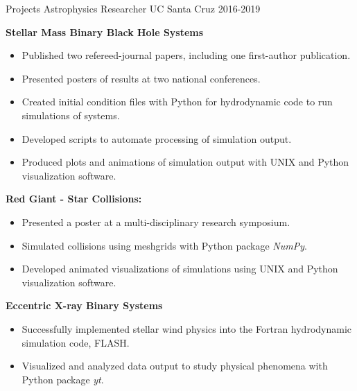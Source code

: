 
\begin{cventries}
	
  \cventry
	{Projects}
	{Astrophysics Researcher \vspace{1mm}}
	{UC Santa Cruz}
	{2016-2019}
	{
		\vspace{0.1cm}
		\begin{cvitems}
			\item {\textbf{Stellar Mass Binary Black Hole Systems}
				\begin{itemize}
					\item Published two refereed-journal papers, including one first-author publication.
					\item Presented posters of results at two national conferences.
					\item Created initial condition files with Python for hydrodynamic code to run simulations of systems. 
					\item Developed scripts to automate processing of simulation output.
					\item Produced plots and animations of simulation output with UNIX and Python visualization software.
				\end{itemize}}			
			\item {\textbf{Red Giant - Star Collisions:} 
				\begin{itemize}
				\item Presented a poster at a multi-disciplinary research symposium.
				\item Simulated collisions using meshgrids with Python package \emph{NumPy}.
				\item Developed animated visualizations of simulations using UNIX and Python visualization software.
				\end{itemize}}
			\item {\textbf{Eccentric X-ray Binary Systems}
				\begin{itemize}
					\item Successfully implemented stellar wind physics into the Fortran hydrodynamic simulation code, FLASH. 
					\item Visualized and analyzed data output to study physical phenomena with Python package \emph{yt}.
				\end{itemize}} 
		\end{cvitems}
	}
	  
  
\end{cventries}
